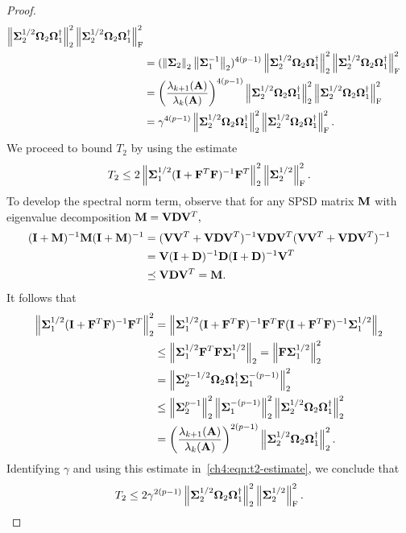 \begin{proof}
\begin{align*}
                   \left\|\mathbf{\Sigma}_2^{1/2} \mathbf{\Omega}_2 \mathbf{\Omega}_1^\dagger\right\|_2^2
                   \left\|\mathbf{\Sigma}_2^{1/2} \mathbf{\Omega}_2 \mathbf{\Omega}_1^\dagger\right\|_\mathrm{F}^2 \\           
     & = (\left\|\mathbf{\Sigma}_2\right\|_2 \left\|\mathbf{\Sigma}_1^{-1}\right\|_2)^{4(p-1)}
                   \left\|\mathbf{\Sigma}_2^{1/2} \mathbf{\Omega}_2 \mathbf{\Omega}_1^\dagger\right\|_2^2
                   \left\|\mathbf{\Sigma}_2^{1/2} \mathbf{\Omega}_2 \mathbf{\Omega}_1^\dagger\right\|_\mathrm{F}^2 \\
     & = \left(\frac{\lambda_{k+1}(\mathbf{A})}{\lambda_k(\mathbf{A})}\right)^{4(p-1)}
            \left\|\mathbf{\Sigma}_2^{1/2} \mathbf{\Omega}_2 \mathbf{\Omega}_1^\dagger\right\|_2^2
            \left\|\mathbf{\Sigma}_2^{1/2} \mathbf{\Omega}_2 \mathbf{\Omega}_1^\dagger\right\|_\mathrm{F}^2 \\
     & = \gamma^{4(p-1)} \left\|\mathbf{\Sigma}_2^{1/2} \mathbf{\Omega}_2 \mathbf{\Omega}_1^\dagger\right\|_2^2
            \left\|\mathbf{\Sigma}_2^{1/2} \mathbf{\Omega}_2 \mathbf{\Omega}_1^\dagger\right\|_\mathrm{F}^2 .
\end{align*}
We proceed to bound $T_2$ by using the estimate
\begin{equation}
\label{ch4:eqn:t2-estimate}
 T_2 \leq 2 \left\|\mathbf{\Sigma}_1^{1/2} 
                    (\mathbf{I} + \mathbf{F}^T \mathbf{F})^{-1} \mathbf{F}^T\right\|_2^2 
            \left\|\mathbf{\Sigma}_2^{1/2}\right\|_\mathrm{F}^2.
\end{equation}
To develop the spectral norm term, observe that for any SPSD 
matrix $\mathbf{M}$ with eigenvalue decomposition 
$\mathbf{M} = \mathbf{V} \mathbf{D} \mathbf{V}^T,$
\begin{align*}
 (\mathbf{I} + \mathbf{M})^{-1} \mathbf{M} (\mathbf{I} + \mathbf{M})^{-1} & = 
 (\mathbf{V}\mathbf{V}^T + \mathbf{V} \mathbf{D} \mathbf{V}^T)^{-1} \mathbf{V} \mathbf{D} \mathbf{V}^T
 (\mathbf{V}\mathbf{V}^T + \mathbf{V} \mathbf{D} \mathbf{V}^T)^{-1} \\
 & = \mathbf{V}(\mathbf{I} + \mathbf{D})^{-1} \mathbf{D} (\mathbf{I} + \mathbf{D})^{-1} \mathbf{V}^T \\
 & \preceq \mathbf{V} \mathbf{D} \mathbf{V}^T = \mathbf{M}.
\end{align*}
It follows that
\begin{align*}
 \left\|\mathbf{\Sigma}_1^{1/2} 
         (\mathbf{I} + \mathbf{F}^T \mathbf{F})^{-1} \mathbf{F}^T\right\|_2^2 & = 
 \left\|\mathbf{\Sigma}_1^{1/2} (\mathbf{I} + \mathbf{F}^T \mathbf{F})^{-1} 
        \mathbf{F}^T \mathbf{F} 
        (\mathbf{I} + \mathbf{F}^T \mathbf{F})^{-1} \mathbf{\Sigma}_1^{1/2}\right\|_2 \\
 & \leq \left\|\mathbf{\Sigma}_1^{1/2} \mathbf{F}^T\mathbf{F} \mathbf{\Sigma}_1^{1/2}\right\|_2 
   =    \left\|\mathbf{F} \mathbf{\Sigma}_1^{1/2}\right\|_2^2 \\
 & = \left\|\mathbf{\Sigma}_2^{p-1/2} 
             \mathbf{\Omega}_2 \mathbf{\Omega}_1^\dagger \mathbf{\Sigma}_1^{-(p-1)} \right\|_2^2 \\
 & \leq \left\|\mathbf{\Sigma}_2^{p-1}\right\|_2^2 \left\|\mathbf{\Sigma}_1^{-(p-1)}\right\|_2^2 
        \left\|\mathbf{\Sigma}_2^{1/2} \mathbf{\Omega}_2 \mathbf{\Omega}_1^\dagger\right\|_2^2 \\
 & = \left( \frac{\lambda_{k+1}(\mathbf{A})}{\lambda_k(\mathbf{A})} \right)^{2(p-1)} 
     \left\|\mathbf{\Sigma}_2^{1/2} \mathbf{\Omega}_2 \mathbf{\Omega}_1^\dagger\right\|_2^2.
\end{align*}
Identifying $\gamma$ and using this estimate in~\eqref{ch4:eqn:t2-estimate}, we conclude that
\[
 T_2 \leq 2 \gamma^{2(p-1)} 
 \left\|\mathbf{\Sigma}_2^{1/2} \mathbf{\Omega}_2 \mathbf{\Omega}_1^\dagger\right\|_2^2 \left\|\mathbf{\Sigma}_2^{1/2}\right\|_\mathrm{F}^2.
\]


\end{proof}
